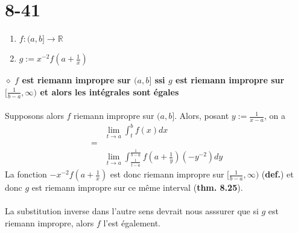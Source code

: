 \documentclass[a4paper,10pt]{article}
\begin{document}
\section*{8-41}
\begin{enumerate}
 \item $f : (a,b] \rightarrow \mathbb{R}$
 \item $g := x^{-2} f(a + \frac{1}{x})$
\end{enumerate}
$\diamond$ \textbf{$f$ est riemann impropre sur $(a,b]$ ssi $g$ est riemann impropre sur $[\frac{1}{b-a}, \infty)$ 
et alors les intégrales sont égales}
\\
\\
Supposons alors $f$ riemann impropre sur $(a,b]$. Alors, posant $y := \frac{1}{x - a}$, on a 
\begin{align*}
 & \lim_{t \to a} \int_t^b f(x) dx \\
 = \\
 & \lim_{t \to a} \int_\frac{1}{t-a}^\frac{1}{b-a} f(a + \frac{1}{y})(-y^{-2}) dy 
\end{align*}
La fonction $-x^{-2}f(a + \frac{1}{x})$ est donc riemann impropre sur $[\frac{1}{b-a}, \infty)$ (\textbf{def.}) et donc
$g$ est riemann impropre sur ce même interval (\textbf{thm. 8.25}). 
\\
\\
La substitution inverse dans l'autre sens devrait nous asssurer que si $g$ est riemann impropre, alors $f$ l'est également.
\end{document}
